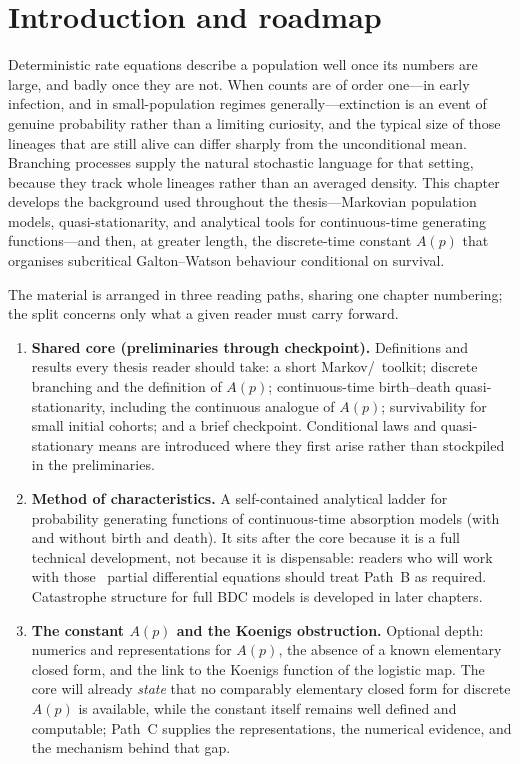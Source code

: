 \section{Introduction and roadmap}
\label{sec:ch2-introduction}

Deterministic rate equations describe a population well once its numbers are large, and badly once they are not. When counts are of order one---in early infection, and in small-population regimes generally---extinction is an event of genuine probability rather than a limiting curiosity, and the typical size of those lineages that are still alive can differ sharply from the unconditional mean. Branching processes supply the natural stochastic language for that setting, because they track whole lineages rather than an averaged density. This chapter develops the background used throughout the thesis---Markovian population models, quasi-stationarity, and analytical tools for continuous-time generating functions---and then, at greater length, the discrete-time constant $A(p)$ that organises subcritical Galton--Watson behaviour conditional on survival.

The material is arranged in three reading paths, sharing one chapter numbering; the split concerns only what a given reader must carry forward.

\begin{enumerate}[label=\textbf{Path~\Alph*.}, leftmargin=*, itemsep=0.4em]
\item \textbf{Shared core (preliminaries through checkpoint).}
Definitions and results every thesis reader should take: a short Markov/\pgf\ toolkit; discrete branching and the definition of $A(p)$; continuous-time birth--death quasi-stationarity, including the continuous analogue of $A(p)$; survivability for small initial cohorts; and a brief checkpoint. Conditional laws and quasi-stationary means are introduced where they first arise rather than stockpiled in the preliminaries.

\item \textbf{Method of characteristics.}
A self-contained analytical ladder for probability generating functions of continuous-time absorption models (with and without birth and death). It sits after the core because it is a full technical development, not because it is dispensable: readers who will work with those \pgf\ partial differential equations should treat Path~B as required. Catastrophe structure for full BDC models is developed in later chapters.

\item \textbf{The constant $A(p)$ and the Koenigs obstruction.}
Optional depth: numerics and representations for $A(p)$, the absence of a known elementary closed form, and the link to the Koenigs function of the logistic map. The core will already \emph{state} that no comparably elementary closed form for discrete $A(p)$ is available, while the constant itself remains well defined and computable; Path~C supplies the representations, the numerical evidence, and the mechanism behind that gap.
\end{enumerate}

